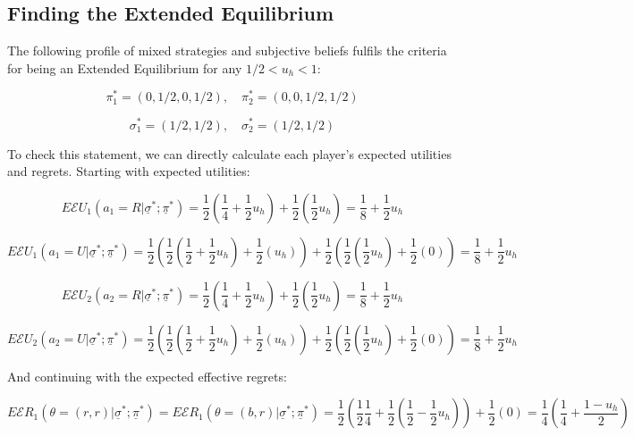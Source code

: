 \documentclass{article}
\theoremstyle{definition}
\begin{document}
\subsection{Finding the Extended Equilibrium}

The following profile of mixed strategies and subjective beliefs fulfils the criteria for being an Extended Equilibrium for any $1/2 < u_h <1$:

\begin{equation}
\pi_1^*=(0,1/2,0,1/2), \quad
\pi_2^*=(0,0,1/2,1/2)
\end{equation}

\begin{equation}
\sigma_1^* = (1/2,1/2), \quad
\sigma_2^* = (1/2,1/2)
\end{equation}

To check this statement, we can directly calculate each player's expected utilities and regrets.
Starting with expected utilities:

\begin{equation}
E\mathcal{E}U_1(a_1=R|\underline{\sigma}^*;\underline{\pi}^*)
=
\frac{1}{2} (\frac{1}{4} +  \frac{1}{2} u_h) + \frac{1}{2} (\frac{1}{2} u_h)
=
\frac{1}{8}+\frac{1}{2} u_h
\end{equation}

\begin{equation}
E\mathcal{E}U_1(a_1=U|\underline{\sigma}^*;\underline{\pi}^*)
=
\frac{1}{2} \left (\frac{1}{2}(\frac{1}{2} + \frac{1}{2} u_h)+\frac{1}{2}(u_h) \right)
+
\frac{1}{2} \left (\frac{1}{2}(\frac{1}{2} u_h) + \frac{1}{2} (0) \right )
=
\frac{1}{8}+\frac{1}{2} u_h
\end{equation}

\begin{equation}
E\mathcal{E}U_2(a_2=R|\underline{\sigma}^*;\underline{\pi}^*)
=
\frac{1}{2} (\frac{1}{4} +  \frac{1}{2} u_h) + \frac{1}{2} (\frac{1}{2} u_h)
=
\frac{1}{8}+\frac{1}{2} u_h
\end{equation}

\begin{equation}
E\mathcal{E}U_2(a_2=U|\underline{\sigma}^*;\underline{\pi}^*)
=
\frac{1}{2} \left (\frac{1}{2}(\frac{1}{2} + \frac{1}{2} u_h)+\frac{1}{2}(u_h) \right)
+
\frac{1}{2} \left (\frac{1}{2}(\frac{1}{2} u_h) + \frac{1}{2} (0) \right )
=
\frac{1}{8}+\frac{1}{2} u_h
\end{equation}

And continuing with the expected effective regrets:

\begin{equation}
E\mathcal{E}R_1(\theta=(r,r)|\underline{\sigma}^*;\underline{\pi}^*)
=
E\mathcal{E}R_1(\theta=(b,r)|\underline{\sigma}^*;\underline{\pi}^*)
=
\frac{1}{2} \left (\frac{1}{2} \frac{1}{4}+\frac{1}{2}(\frac{1}{2}-\frac{1}{2}u_h) \right)
+
\frac{1}{2} \left (0 \right )
=
\frac{1}{4} \left ( \frac{1}{4} + \frac{1-u_h}{2} \right )
\end{equation}
\end{document}
